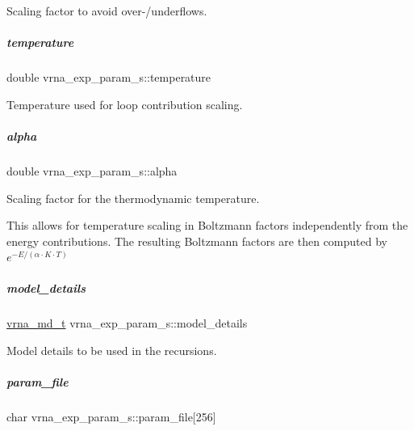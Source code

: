 Scaling factor to avoid over-\//underflows. 

\mbox{\label{group__energy__parameters_a674656d65ea957ddbeff8bd146b7fc16}} 
\subparagraph{\texorpdfstring{temperature}{temperature}}
{\footnotesize\ttfamily double vrna\+\_\+exp\+\_\+param\+\_\+s\+::temperature}



Temperature used for loop contribution scaling. 

\mbox{\label{group__energy__parameters_a77145830b7bb01b36c3217b363310ef0}} 
\subparagraph{\texorpdfstring{alpha}{alpha}}
{\footnotesize\ttfamily double vrna\+\_\+exp\+\_\+param\+\_\+s\+::alpha}



Scaling factor for the thermodynamic temperature. 

This allows for temperature scaling in Boltzmann factors independently from the energy contributions. The resulting Boltzmann factors are then computed by $ e^{-E/(\alpha \cdot K \cdot T)} $ \mbox{\label{group__energy__parameters_ac18055127bccc27c1223f1d2f3b01b53}} 
\subparagraph{\texorpdfstring{model\+\_\+details}{model\_details}}
{\footnotesize\ttfamily \mbox{\hyperlink{group__model__details_ga1f8a10e12a0a1915f2a4eff0b28ea17c}{vrna\+\_\+md\+\_\+t}} vrna\+\_\+exp\+\_\+param\+\_\+s\+::model\+\_\+details}



Model details to be used in the recursions. 

\mbox{\label{group__energy__parameters_a8e1b02a4753a9b64c3c9ae8529b9d75c}} 
\subparagraph{\texorpdfstring{param\+\_\+file}{param\_file}}
{\footnotesize\ttfamily char vrna\+\_\+exp\+\_\+param\+\_\+s\+::param\+\_\+file\mbox{[}256\mbox{]}}



